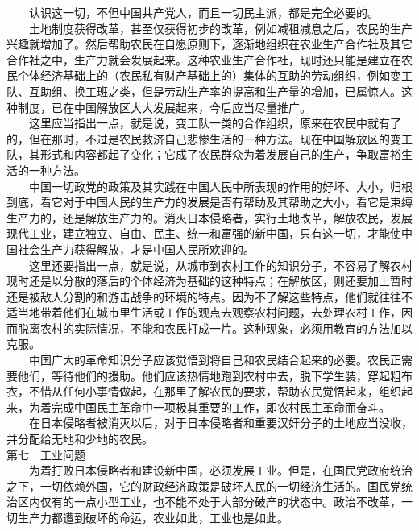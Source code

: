 \documentclass[cn,11pt,chinese]{elegantbook}
\begin{document}
　　认识这一切，不但中国共产党人，而且一切民主派，都是完全必要的。\\
　　土地制度获得改革，甚至仅获得初步的改革，例如减租减息之后，农民的生产兴趣就增加了。然后帮助农民在自愿原则下，逐渐地组织在农业生产合作社及其它合作社之中，生产力就会发展起来。这种农业生产合作社，现时还只能是建立在农民个体经济基础上的（农民私有财产基础上的）集体的互助的劳动组织，例如变工队、互助组、换工班之类，但是劳动生产率的提高和生产量的增加，已属惊人。这种制度，已在中国解放区大大发展起来，今后应当尽量推广。\\
　　这里应当指出一点，就是说，变工队一类的合作组织，原来在农民中就有了的，但在那时，不过是农民救济自己悲惨生活的一种方法。现在中国解放区的变工队，其形式和内容都起了变化；它成了农民群众为着发展自己的生产，争取富裕生活的一种方法。\\
　　中国一切政党的政策及其实践在中国人民中所表现的作用的好坏、大小，归根到底，看它对于中国人民的生产力的发展是否有帮助及其帮助之大小，看它是束缚生产力的，还是解放生产力的。消灭日本侵略者，实行土地改革，解放农民，发展现代工业，建立独立、自由、民主、统一和富强的新中国，只有这一切，才能使中国社会生产力获得解放，才是中国人民所欢迎的。\\
　　这里还要指出一点，就是说，从城市到农村工作的知识分子，不容易了解农村现时还是以分散的落后的个体经济为基础的这种特点；在解放区，则还要加上暂时还是被敌人分割的和游击战争的环境的特点。因为不了解这些特点，他们就往往不适当地带着他们在城市里生活或工作的观点去观察农村问题，去处理农村工作，因而脱离农村的实际情况，不能和农民打成一片。这种现象，必须用教育的方法加以克服。\\
　　中国广大的革命知识分子应该觉悟到将自己和农民结合起来的必要。农民正需要他们，等待他们的援助。他们应该热情地跑到农村中去，脱下学生装，穿起粗布衣，不惜从任何小事情做起，在那里了解农民的要求，帮助农民觉悟起来，组织起来，为着完成中国民主革命中一项极其重要的工作，即农村民主革命而奋斗。\\
　　在日本侵略者被消灭以后，对于日本侵略者和重要汉奸分子的土地应当没收，并分配给无地和少地的农民。\\
第七　工业问题\\
　　为着打败日本侵略者和建设新中国，必须发展工业。但是，在国民党政府统治之下，一切依赖外国，它的财政经济政策是破坏人民的一切经济生活的。国民党统治区内仅有的一点小型工业，也不能不处于大部分破产的状态中。政治不改革，一切生产力都遭到破坏的命运，农业如此，工业也是如此。\\
\end{document}
